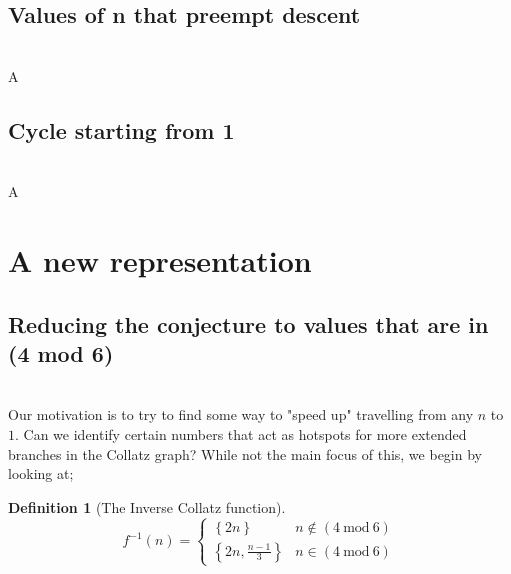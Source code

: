 \documentclass[12pt,a4paper]{amsart}
\numberwithin{equation}{section}
\theoremstyle{plain}
\theoremstyle{definition}
\newtheorem{Def}[Th]{Definition}
\begin{document}
\subsection{Values of n that preempt descent} \hfill\\

A

\subsection{Cycle starting from 1} \hfill\\

A

\section{A new representation}

\subsection{Reducing the conjecture to values that are in (4 mod 6)} \hfill\\

Our motivation is to try to find some way to "speed up" travelling from any $n$ to $1$. Can we identify certain numbers that act as hotspots for more extended branches in the Collatz graph? While not the main focus of this, we begin by looking at;

\begin{Def}[The Inverse Collatz function]
\begin{equation}
f^{-1} \left ( n \right )=\left\{\begin{matrix}
\left \{ 2n \right \} & n \notin \left ( 4\:\mathrm{mod}\:6 \right ) \\ 
\left \{ 2n, \frac{n-1}{3} \right \} & n \in \left ( 4\:\mathrm{mod}\:6 \right )
\end{matrix}\right.
\end{equation}
\end{Def}
\end{document}
